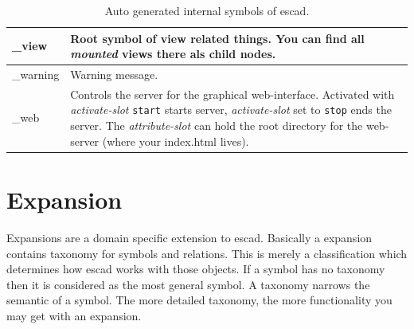 \documentclass[a4paper, 12pt, openany]{scrbook}
\begin{document}
\begin{table}[htbp]
\begin{tabular}{|p{4cm}|p{12cm}|}
  \hline
  \_view & Root symbol of view related things. You can find all \emph{mounted} views there als child nodes. \\
  \hline
  \_warning & Warning message. \\
  \hline
  \_web & Controls the server for the graphical web-interface. Activated with \emph{activate-slot} \texttt{start} starts server, \emph{activate-slot} set to \texttt{stop} ends the server. The \emph{attribute-slot} can hold the root directory for the web-server (where your index.html lives). \\
  \hline
\end{tabular}
\caption{Auto generated internal symbols of escad.}
\label{tab:internal-symbols}
\end{table}
\section{Expansion}
Expansions are a domain specific extension to escad. Basically a expansion contains taxonomy for symbols and relations. This is merely a classification which determines how escad works with those objects. If a symbol has no taxonomy then it is considered as the most general symbol. A taxonomy narrows the semantic of a symbol. The more detailed taxonomy, the more functionality you may get with an expansion.
\end{document}
